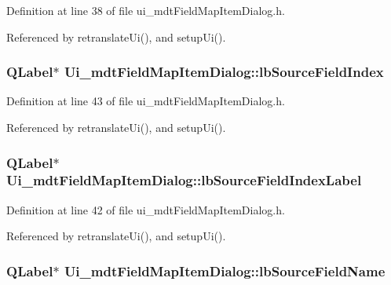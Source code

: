 Definition at line 38 of file ui\-\_\-mdt\-Field\-Map\-Item\-Dialog.\-h.



Referenced by retranslate\-Ui(), and setup\-Ui().

\hypertarget{class_ui__mdt_field_map_item_dialog_a421539356822e2719359f1f8897b9ccd}{
\subsubsection[{lb\-Source\-Field\-Index}]{\setlength{\rightskip}{0pt plus 5cm}Q\-Label$\ast$ Ui\-\_\-mdt\-Field\-Map\-Item\-Dialog\-::lb\-Source\-Field\-Index}}\label{class_ui__mdt_field_map_item_dialog_a421539356822e2719359f1f8897b9ccd}


Definition at line 43 of file ui\-\_\-mdt\-Field\-Map\-Item\-Dialog.\-h.



Referenced by retranslate\-Ui(), and setup\-Ui().

\hypertarget{class_ui__mdt_field_map_item_dialog_a2c28b94e9577588a2318bff34c673ba5}{
\subsubsection[{lb\-Source\-Field\-Index\-Label}]{\setlength{\rightskip}{0pt plus 5cm}Q\-Label$\ast$ Ui\-\_\-mdt\-Field\-Map\-Item\-Dialog\-::lb\-Source\-Field\-Index\-Label}}\label{class_ui__mdt_field_map_item_dialog_a2c28b94e9577588a2318bff34c673ba5}


Definition at line 42 of file ui\-\_\-mdt\-Field\-Map\-Item\-Dialog.\-h.



Referenced by retranslate\-Ui(), and setup\-Ui().

\hypertarget{class_ui__mdt_field_map_item_dialog_a958e84acebe80166871853d42b8dd615}{
\subsubsection[{lb\-Source\-Field\-Name}]{\setlength{\rightskip}{0pt plus 5cm}Q\-Label$\ast$ Ui\-\_\-mdt\-Field\-Map\-Item\-Dialog\-::lb\-Source\-Field\-Name}}\label{class_ui__mdt_field_map_item_dialog_a958e84acebe80166871853d42b8dd615}



